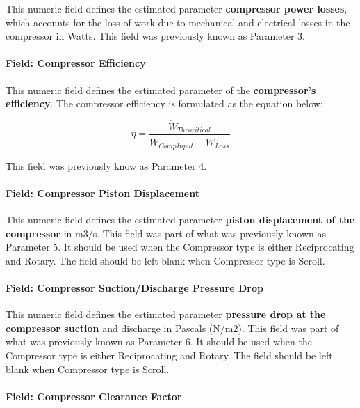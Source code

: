 This numeric field defines the estimated parameter \textbf{compressor power losses}, which accounts for the loss of work due to mechanical and electrical losses in the compressor in Watts. This field was previously known as Parameter 3.

\paragraph{Field: Compressor Efficiency}\label{field-compressor-efficiency-1}

This numeric field defines the estimated parameter of the \textbf{compressor's efficiency}. The compressor efficiency is formulated as the equation below:

\begin{equation}
\eta  = \frac{{{{\dot W}_{Theoritical}}}}{{{{\dot W}_{CompInput}} - {{\dot W}_{Loss}}}}
\end{equation}

This field was previously know as Parameter 4.

\paragraph{Field: Compressor Piston Displacement}\label{field-compressor-piston-displacement-1}

This numeric field defines the estimated parameter \textbf{piston displacement of the compressor} in m3/s. This field was part of what was previously known as Parameter 5. It should be used when the Compressor type is either Reciprocating and Rotary. The field should be left blank when Compressor type is Scroll.

\paragraph{Field: Compressor Suction/Discharge Pressure Drop}\label{field-compressor-suctiondischarge-pressure-drop-1}

This numeric field defines the estimated parameter \textbf{pressure drop at the compressor suction} and discharge in Pascals (N/m2). This field was part of what was previously known as Parameter 6. It should be used when the Compressor type is either Reciprocating and Rotary. The field should be left blank when Compressor type is Scroll.

\paragraph{Field: Compressor Clearance Factor}\label{field-compressor-clearance-factor-1}

